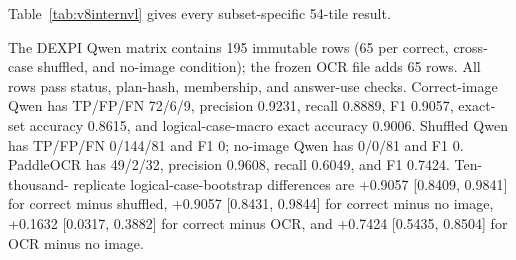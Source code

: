 \documentclass[11pt]{article}
\begin{document}
Table~\ref{tab:v8internvl} gives every subset-specific 54-tile result.



The DEXPI Qwen matrix contains 195 immutable rows (65 per correct, cross-case
shuffled, and no-image condition); the frozen OCR file adds 65 rows. All rows
pass status, plan-hash, membership, and answer-use checks. Correct-image Qwen
has TP/FP/FN 72/6/9, precision 0.9231, recall 0.8889, F1 0.9057, exact-set
accuracy 0.8615, and logical-case-macro exact accuracy 0.9006. Shuffled Qwen
has TP/FP/FN 0/144/81 and F1 0; no-image Qwen has 0/0/81 and F1 0. PaddleOCR
has 49/2/32, precision 0.9608, recall 0.6049, and F1 0.7424. Ten-thousand-
replicate logical-case-bootstrap differences are +0.9057 [0.8409, 0.9841]
for correct minus shuffled, +0.9057 [0.8431, 0.9844] for correct minus no
image, +0.1632 [0.0317, 0.3882] for correct minus OCR, and +0.7424 [0.5435,
0.8504] for OCR minus no image.
\end{document}
